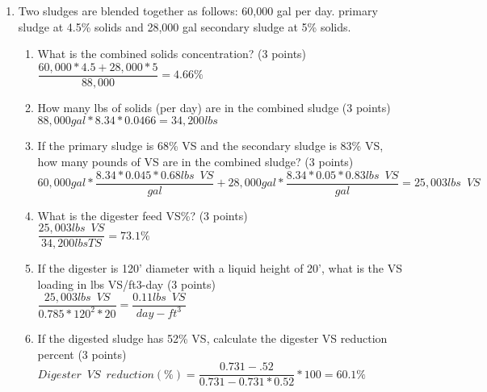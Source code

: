 \begin{enumerate}
\item Two sludges are blended together as follows: 60,000 gal per day. primary sludge at 4.5\% solids and 28,000 gal secondary sludge at 5\% solids. 
\begin{enumerate}
\item What is the combined solids concentration?  (3 points)\\

$\dfrac{60,000*4.5+28,000*5}{88,000}=\boxed{4.66\%}$\\
\vspace{2cm}
\item How many lbs of solids (per day) are in the combined sludge (3 points)\\

$88,000 gal*8.34*0.0466 = \boxed{34,200 lbs}$\\
\vspace{2cm}


\item If the primary sludge is 68\% VS and the secondary sludge is 83\% VS, how many pounds of VS are in the combined sludge? (3 points)\\
$60,000 gal *\dfrac{8.34*0.045*0.68lbs \enspace VS}{gal}+28,000 gal *\dfrac{8.34*0.05*0.83lbs \enspace VS}{gal}=\boxed{25,003 lbs \enspace VS}$
\vspace{2cm}

\item What is the digester feed VS\%?  (3 points)\\
$\dfrac{25,003 lbs \enspace VS}{34,200 lbs TS}=\boxed{73.1\%}$

\vspace{2cm}



\item If the digester is 120’ diameter with a liquid height of 20’, what is the VS loading in lbs VS/ft3-day (3 points)\\

$\dfrac{25,003 lbs \enspace VS}{0.785*120^2*20}=\boxed{\dfrac{0.11 lbs \enspace VS}{day-ft^3}}$\\
\vspace{2cm}





\item If the digested sludge has 52\% VS, calculate the digester VS reduction percent (3 points)\\

$
Digester \enspace VS \enspace reduction (\%)=
	\dfrac
	{0.731 - .52}
	{0.731 - 0.731 *0.52}
	*100=\boxed{60.1\%}
$\\
\vspace{2cm}


\end{enumerate}
\end{enumerate}
